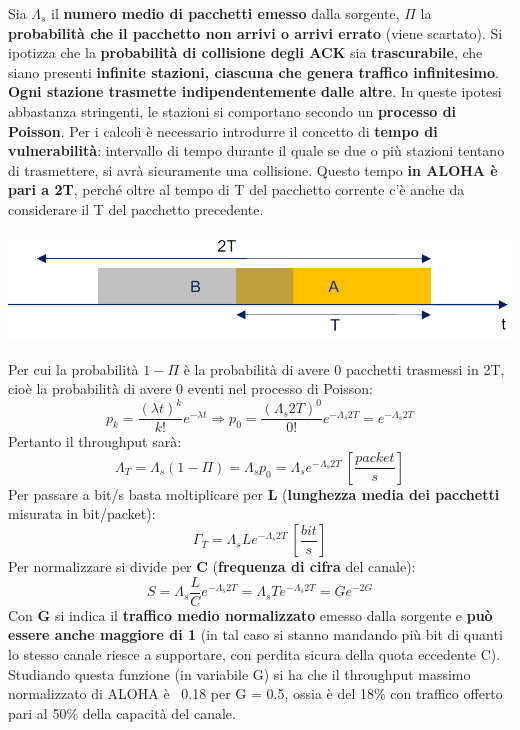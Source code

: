 \documentclass[12pt]{article}
\begin{document}
Sia $\Lambda_s$ il \textbf{numero medio di pacchetti emesso} dalla sorgente, $\Pi$ la \textbf{probabilità che il pacchetto non arrivi o arrivi errato} (viene scartato).
Si ipotizza che la \textbf{probabilità di collisione degli ACK} sia \textbf{trascurabile}, che siano presenti \textbf{infinite stazioni, ciascuna che genera traffico infinitesimo}. \textbf{Ogni stazione trasmette indipendentemente dalle altre}. In queste ipotesi abbastanza stringenti, le stazioni si comportano secondo un \textbf{processo di Poisson}. Per i calcoli è necessario introdurre il concetto di \textbf{tempo di vulnerabilità}: intervallo di tempo durante il quale se due o più stazioni tentano di trasmettere, si avrà sicuramente una collisione. Questo tempo \textbf{in ALOHA è pari a 2T}, perché oltre al tempo di T del pacchetto corrente c'è anche da considerare il T del pacchetto precedente.
\begin{center}
    \includegraphics[scale=0.3]{aloha_vulnerability}
\end{center}
Per cui la probabilità $1 - \Pi$ è la probabilità di avere 0 pacchetti trasmessi in 2T, cioè la probabilità di avere 0 eventi nel processo di Poisson:
\begin{equation*}
    p_k = \frac{(\lambda t)^k}{k!}e^{-\lambda t} \Rightarrow p_0 = \frac{(\Lambda_s2T)^0}{0!}e^{-\Lambda_s2T} = e^{-\Lambda_s2T}
\end{equation*}
Pertanto il throughput sarà:
\begin{equation*}
    \Lambda_T = \Lambda_s(1 - \Pi) = \Lambda_s p_0 = \Lambda_se^{-\Lambda_s2T}\  \left[\frac{packet}{s}\right]
\end{equation*}
Per passare a bit/s basta moltiplicare per \textbf{L} (\textbf{lunghezza media dei pacchetti} misurata in bit/packet):
\begin{equation*}
    \Gamma_T = \Lambda_sLe^{-\Lambda_s2T}\ \left[\frac{bit}{s}\right]
\end{equation*}
Per normalizzare si divide per \textbf{C} (\textbf{frequenza di cifra} del canale):
\begin{equation*}
    S = \Lambda_s\frac{L}{C}e^{-\Lambda_s2T} = \Lambda_s T e^{-\Lambda_s2T} = Ge^{-2G}
\end{equation*}
Con \textbf{G} si indica il \textbf{traffico medio normalizzato} emesso dalla sorgente e \textbf{può essere anche maggiore di 1} (in tal caso si stanno mandando più bit di quanti lo stesso canale riesce a supportare, con perdita sicura della quota eccedente C). Studiando questa funzione (in variabile G) si ha che il throughput massimo normalizzato di ALOHA è ~0.18 per G = 0.5, ossia è del 18\% con traffico offerto pari al 50\% della capacità del canale.
\end{document}
